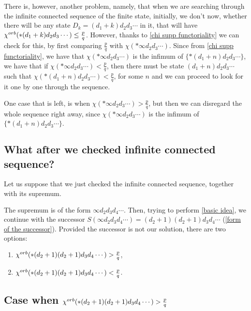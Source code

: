 There is, however, another problem, namely, that when we are searching through 
the infinite connected sequence of the finite state, 
initially, we don't now, whether there will be any state 
$D_k = (d_1+k)d_2d_3\cdots$ in it, that 
will have ${\chi^{orb}(*(d_1+k)d_2d_3\cdots)} \leq \frac{p}{q}$. 
However, thanks to \ref{chi supp functoriality} 
we can check for this, by first comparing $\frac{p}{q}$ with $\chi(*\infty d_2d_3\cdots)$. 
Since from \ref{chi supp functoriality}, we have that 
$\chi(*\infty d_2d_3\cdots)$ is the infimum of $\{*(d_1+n)d_2d_3\cdots\}$, 
we have that if $\chi(*\infty d_2d_3\cdots) < \frac{p}{q}$, then
there must be state $(d_1+n)d_2d_3\cdots$ such that $\chi(*(d_1+n)d_2d_3\cdots) < \frac{p}{q}$, 
for some $n$ and we can proceed to look for it one by one through the sequence.

One case that is left, is when $\chi(*\infty d_2d_3\cdots) > \frac{p}{q}$, but then we can 
disregard the whole sequence right away, since 
$\chi(*\infty d_2d_3\cdots)$ is the infimum of $\{*(d_1+n)d_2d_3\cdots\}$.

\subsection{What after we checked infinite connected sequence?}
Let us suppose that we just checked the infinite connected sequence, together with its supremum. 


The supremum is of the form $\infty d_2 d_3d_4\cdots$.
Then, trying to perform \ref{basic idea}, 
we continue with the successor $S(\infty d_2 d_3d_4\cdots) = (d_2+1)(d_2+1)d_3d_4\cdots$ 
(\ref{form of the successor}). Provided the successor is not our solution, 
there are two options:
\begin{enumerate} 
\item ${\chi^{orb}(*(d_2+1)(d_2+1)d_3d_4\cdots)} > \frac{p}{q}$,
\item ${\chi^{orb}(*(d_2+1)(d_2+1)d_3d_4\cdots)} < \frac{p}{q}$.
\end{enumerate} 

\subsection{Case when ${\chi^{orb}(*(d_2+1)(d_2+1)d_3d_4\cdots)} > \frac{p}{q}$}\label{greater idea}

